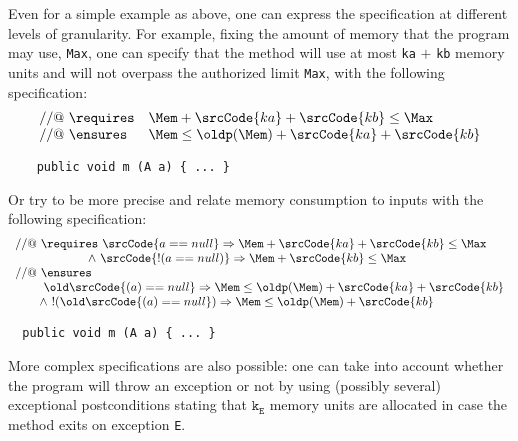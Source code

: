 Even for a simple example as above, one can express the specification
at different levels of granularity. For example, fixing the amount of
memory that the program may use, \verb!Max!, one can specify that the
method will use at most \verb!ka! $+$ \verb!kb! memory units and will not
overpass the authorized limit \verb!Max!, with the following
specification:
$$
\begin{array}{ll}
//@ \ \requires & \Mem + \srcCode{ka} + \srcCode{kb} \leq \Max \\
//@ \ \ensures &  \Mem \leq \oldp(\Mem) + \srcCode{ka} + \srcCode{kb}     
\end{array}
$$
\begin{verbatim}
    public void m (A a) { ... }
\end{verbatim}
Or try to be more precise and relate memory consumption to inputs with
the following specification:
$$
\begin{array}{l}
//@ \ \requires \ \srcCode{a==null} \Rightarrow \Mem + \srcCode{ka} + \srcCode{kb} \leq \Max \\ 
\ \ \ \ \ \ \ \ \ \ \ \ \ \ \ \ \ \ \land \ \srcCode{!(a==null)} \Rightarrow \Mem + \srcCode{kb} \leq \Max \\
//@ \ \ensures \\
\ \ \ \ \ \ \   \old\srcCode{(a)==null} \Rightarrow \Mem \leq \oldp(\Mem) + \srcCode{ka} + \srcCode{kb} \\ 
\ \ \ \ \ \ \land \ !(\old\srcCode{(a)==null}) \Rightarrow \Mem \leq \oldp(\Mem) + \srcCode{kb}    
\end{array}
$$
\begin{verbatim}
  public void m (A a) { ... }
\end{verbatim}
More complex specifications are also possible: one can
take into account whether the program will throw an exception or not by
using (possibly several) exceptional postconditions stating that
$\texttt{k}_{\texttt{E}}$ memory units are allocated in case the
method exits on exception \texttt{E}.

